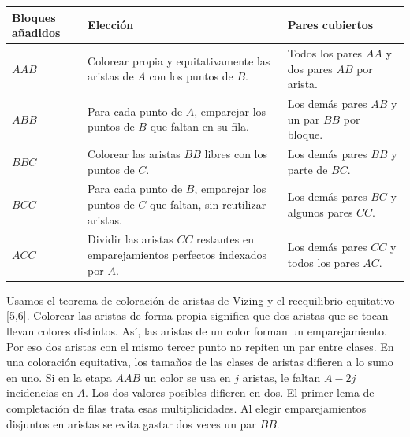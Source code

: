 \documentclass[spanish,11pt,a4paper]{article}
\begin{document}
{\begin{longtable}[]{@{}
  >{\raggedright\arraybackslash}p{}
  >{\raggedright\arraybackslash}p{}
  >{\raggedright\arraybackslash}p{}@{}}
\toprule\noalign{}
\begin{minipage}[b]{\linewidth}\raggedright
Bloques añadidos
\end{minipage} & \begin{minipage}[b]{\linewidth}\raggedright
Elección
\end{minipage} & \begin{minipage}[b]{\linewidth}\raggedright
Pares cubiertos
\end{minipage} \\
\midrule\noalign{}
\endhead
\bottomrule\noalign{}
\endlastfoot
\(AAB\) & Colorear propia y equitativamente las aristas de \(A\) con los puntos de \(B\). & Todos los pares \(AA\) y dos pares \(AB\) por arista. \\
\(ABB\) & Para cada punto de \(A\), emparejar los puntos de \(B\) que faltan en su fila. & Los demás pares \(AB\) y un par \(BB\) por bloque. \\
\(BBC\) & Colorear las aristas \(BB\) libres con los puntos de \(C\). & Los demás pares \(BB\) y parte de \(BC\). \\
\(BCC\) & Para cada punto de \(B\), emparejar los puntos de \(C\) que faltan, sin reutilizar aristas. & Los demás pares \(BC\) y algunos pares \(CC\). \\
\(ACC\) & Dividir las aristas \(CC\) restantes en emparejamientos perfectos indexados por \(A\). & Los demás pares \(CC\) y todos los pares \(AC\). \\
\end{longtable}
}

Usamos el teorema de coloración de aristas de Vizing y el reequilibrio equitativo {[}5,6{]}. Colorear las aristas de forma propia significa que dos aristas que se tocan llevan colores distintos. Así, las aristas de un color forman un emparejamiento. Por eso dos aristas con el mismo tercer punto no repiten un par entre clases. En una coloración equitativa, los tamaños de las clases de aristas difieren a lo sumo en uno. Si en la etapa \(AAB\) un color se usa en \(j\) aristas, le faltan \(A-2j\) incidencias en \(A\). Los dos valores posibles difieren en dos. El primer lema de completación de filas trata esas multiplicidades. Al elegir emparejamientos disjuntos en aristas se evita gastar dos veces un par \(BB\).
\end{document}
